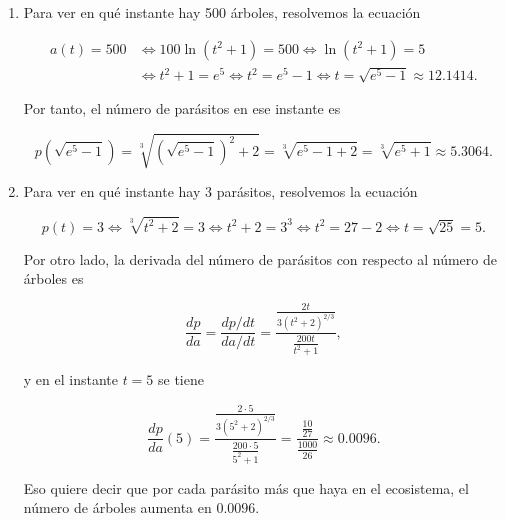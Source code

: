 \documentclass[
  a4paper,
]{scrreport}
\theoremstyle{definition}
\theoremstyle{remark}
\begin{document}
\begin{tcolorbox}[enhanced jigsaw, left=2mm, coltitle=black, colbacktitle=quarto-callout-tip-color!10!white, opacitybacktitle=0.6, colback=white, breakable, titlerule=0mm, toptitle=1mm, rightrule=.15mm, bottomtitle=1mm, bottomrule=.15mm, toprule=.15mm, leftrule=.75mm, arc=.35mm, opacityback=0, title=\textcolor{quarto-callout-tip-color}{\faLightbulb}\hspace{0.5em}{Solución}, colframe=quarto-callout-tip-color-frame]

\begin{enumerate}
\def\labelenumi{\alph{enumi}.}
\item
  Para ver en qué instante hay 500 árboles, resolvemos la ecuación

  \begin{align*}
  a(t) = 500 
  &\Leftrightarrow 100\ln(t^2+1) = 500
  \Leftrightarrow \ln(t^2+1) = 5 \\
  &\Leftrightarrow t^2+1 = e^5
  \Leftrightarrow t^2 = e^5-1
  \Leftrightarrow t = \sqrt{e^5-1}
  \approx 12.1414.
  \end{align*}

  Por tanto, el número de parásitos en ese instante es

  \[
  p(\sqrt{e^5-1})
  = \sqrt[3]{(\sqrt{e^5-1})^2  + 2}
  = \sqrt[3]{e^5-1  + 2}
  = \sqrt[3]{e^5+1}
  \approx 5.3064. 
  \]
\item
  Para ver en qué instante hay 3 parásitos, resolvemos la ecuación

  \[
  p(t) = 3 
  \Leftrightarrow \sqrt[3]{t^2+2} = 3
  \Leftrightarrow t^2+2 = 3^3
  \Leftrightarrow t^2 = 27-2
  \Leftrightarrow t = \sqrt{25}
  = 5.
  \]

  Por otro lado, la derivada del número de parásitos con respecto al
  número de árboles es

  \[
  \frac{dp}{da}
  = \frac{dp/dt}{da/dt}
  = \frac{\frac{2t}{3(t^2+2)^{2/3}}}{\frac{200t}{t^2+1}},
  \]

  y en el instante \(t=5\) se tiene

  \[
  \frac{dp}{da}(5) 
  = \frac{\frac{2\cdot 5}{3(5^2+2)^{2/3}}}{\frac{200\cdot 5}{5^2+1}}
  = \frac{\frac{10}{27}}{\frac{1000}{26}}
  \approx 0.0096.
  \]

  Eso quiere decir que por cada parásito más que haya en el ecosistema,
  el número de árboles aumenta en \(0.0096\).
\end{enumerate}

\end{tcolorbox}
\end{document}
